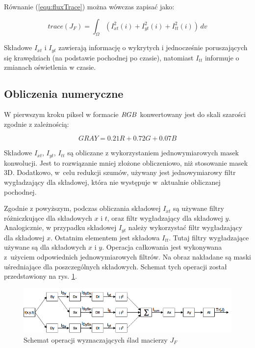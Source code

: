 \documentclass[10pt,a4paper]{article}
\begin{document}
Równanie (\ref{equ:fluxTrace}) można wówczas zapisać jako:

\begin{equation}
	trace(J_F) = \int_\Omega \left(I_{xt}^2(i) + I_{yt}^2(i) + I_{tt}^2(i)\right)\,dv
\label{equ:fluxTraceFinal}
\end{equation}

Składowe $I_{xt}$ i $I_{yt}$ zawierają informację o wykrytych i jednocześnie poruszających się krawędziach (na podstawie pochodnej po czasie), natomiast $I_{tt}$ informuje o zmianach oświetlenia w czasie.
	
\subsection{Obliczenia numeryczne}
\label{sec:FluxObliczenia}

W pierwszym kroku piksel w formacie $\small{RGB}$ konwertowany jest do skali szarości zgodnie z zależnością:

\begin{equation}
GRAY = 0.21R + 0.72G + 0.07B
\label{equ:grayscaleConversion}
\end{equation}

Składowe $I_{xt}$, $I_{yt}$, $I_{tt}$ są obliczane z wykorzystaniem jednowymiarowych masek konwolucji. Jest to rozwiązanie mniej złożone obliczeniowo, niż stosowanie masek 3D. Dodatkowo, w~celu redukcji szumów, używany jest jednowymiarowy filtr wygładzający dla składowej, która nie występuje w~aktualnie obliczanej pochodnej.
 
Zgodnie z powyższym, podczas obliczania składowej $I_{xt}$ są używane filtry różniczkujące dla składowych $x$ i $t$, oraz filtr wygładzający dla składowej $y$. Analogicznie, w przypadku składowej $I_{yt}$ należy wykorzystać filtr wygładzający dla składowej $x$. Ostatnim elementem jest składowa $I_{tt}$. Tutaj filtry wygładzające używane są dla składowych $x$ i $y$. Operacja całkowania jest wykonywana z~użyciem odpowiednich jednowymiarowych filtrów. Na obraz nakładane są maski uśredniające dla poszczególnych składowych. Schemat tych operacji został przedstawiony na rys. \ref{fig:FluxOperationFlow}.

		\begin{figure}[h!]
				\centering
				\includegraphics[scale=0.6]{img/FluxOperationFlow.png}
				\caption{Schemat operacji wyznaczających ślad macierzy $J_F$}
				\label{fig:FluxOperationFlow}
		\end{figure}
\end{document}
